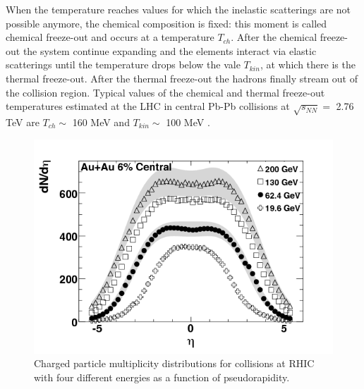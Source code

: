 When the temperature reaches values for which the inelastic scatterings are not possible anymore, the chemical composition is fixed: this moment is called chemical freeze-out and occurs at a temperature $T_{ch}$. After the chemical freeze-out  the system continue expanding and the elements interact via elastic scatterings until the temperature drops below the vale $T_{kin}$, at which there is the thermal freeze-out. After the thermal freeze-out the hadrons finally stream out of the collision region. Typical values of the chemical and thermal freeze-out temperatures estimated at the LHC in central Pb-Pb collisions at $\sqrt{s_{NN}} =$ 2.76 TeV are $T_{ch}\sim$ 160 MeV and $T_{kin}\sim$ 100 MeV \cite{temp}.
%
\begin{figure}
  \centering
  \includegraphics[scale=0.5]{figures/dNdeta.png}
  \caption{Charged particle multiplicity distributions for collisions at RHIC with four different energies as a function of pseudorapidity\cite{dndeta}.}
  \label{fig:dndeta}
\end{figure}
%
%
